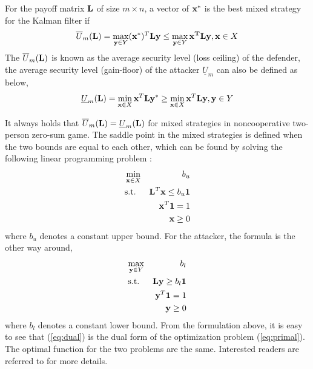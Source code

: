 \documentclass{article}
\begin{document}
For the payoff matrix ${\bf L}$ of size $m\times n$, a vector of $\bf{x}^*$ is the best mixed strategy for the Kalman filter if 
\begin{equation}
	\overline{U}_{m}({\bf L})=\max_{{\bf y} \in Y}({\bf x}^*)^T{ {\bf L}}{\bf y} \le \max_{{\bf y} \in Y}{\bf x^T}{ {\bf L}}{\bf y}, {\bf x} \in X	
\end{equation}
The $\overline{U}_m({\bf L})$ is known as the average security level (loss ceiling) of the defender, the average security level (gain-floor) of the attacker $\underline{U}_m $ can also be defined as below,
\begin{eqnarray}
\underline{U}_m({\bf L})=\min_{{\bf x} \in X}{\bf x}^T{ {\bf L}}{\bf y}^* \ge \min_{{\bf x} \in X}{\bf x}^T{ {\bf L}}{\bf y}, {\bf y} \in Y
\end{eqnarray}

It always holds that $\overline{U}_m({ {\bf L}})= \underline{U}_m({ {\bf L}})$ for mixed strategies in noncooperative two-person zero-sum game. The saddle point in the mixed strategies is defined when the two bounds are equal to each other, which  can be found by solving the following  linear programming problem \cite{basar&olsder:book}:
\begin{eqnarray}
\label{eq:primal}
	\min_{{\bf x} \in X}&& b_u \\
	\text{s.t.}\;\;&&{\bf L}^T{\bf x} \le b_u{\bf 1}\nonumber\\
	&& {\bf x}^T{\bf 1}=1 \nonumber\\
	&& {\bf x} \ge 0\nonumber
\end{eqnarray}
where $b_u$ denotes a constant upper bound. For the attacker, the formula is the other way around,
\begin{eqnarray}
\label{eq:dual}
\max_{{\bf y} \in Y}&& b_l \\
\text{s.t.}\;\;&&{{\bf L}}{\bf y}\ge b_l{\bf 1}\nonumber\\
&& {\bf y}^T{\bf 1}=1  \nonumber\\
&& {\bf y} \ge 0\nonumber
\end{eqnarray}
where $b_l$ denotes a constant lower bound. From the formulation above, it is easy to see that (\ref{eq:dual}) is the dual form of the optimization problem (\ref{eq:primal}). The optimal function for the two problems are the same. Interested readers are referred to \cite{basar&olsder:book} for more details.
\end{document}
